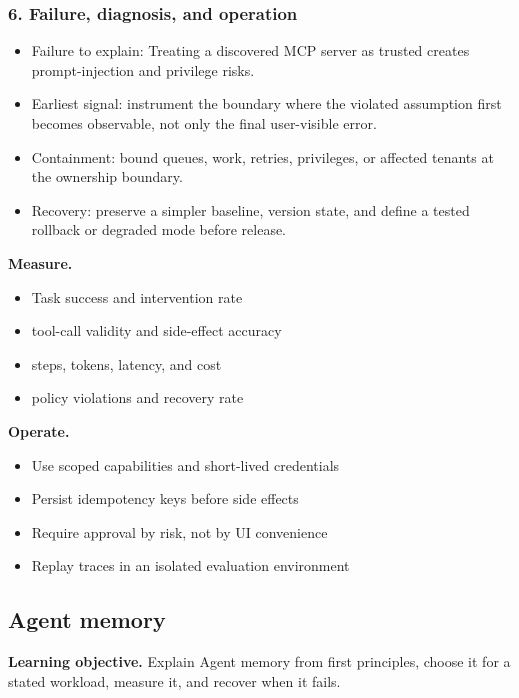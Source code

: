 \subsubsection*{6. Failure, diagnosis, and operation}
\begin{itemize}
\item Failure to explain: Treating a discovered MCP server as trusted creates prompt-injection and privilege risks.
\item Earliest signal: instrument the boundary where the violated assumption first becomes observable, not only the final user-visible error.
\item Containment: bound queues, work, retries, privileges, or affected tenants at the ownership boundary.
\item Recovery: preserve a simpler baseline, version state, and define a tested rollback or degraded mode before release.
\end{itemize}
\textbf{Measure.}\begin{itemize}
\item Task success and intervention rate
\item tool-call validity and side-effect accuracy
\item steps, tokens, latency, and cost
\item policy violations and recovery rate
\end{itemize}
\textbf{Operate.}\begin{itemize}
\item Use scoped capabilities and short-lived credentials
\item Persist idempotency keys before side effects
\item Require approval by risk, not by UI convenience
\item Replay traces in an isolated evaluation environment
\end{itemize}
\subsection{Agent memory}
\textbf{Learning objective.} Explain Agent memory from first principles, choose it for a stated workload, measure it, and recover when it fails.
